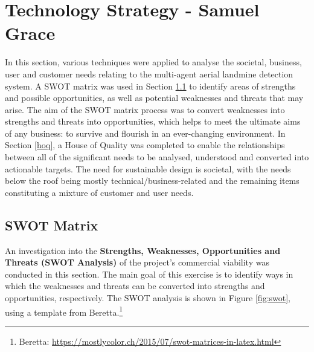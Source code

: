 
\section{Technology Strategy - Samuel Grace}
\label{sec:techstrat}

In this section, various techniques were applied to analyse the societal, business, user and customer needs relating to the multi-agent aerial landmine detection system. A SWOT matrix was used in Section \ref{sec:swot} to identify areas of strengths and possible opportunities, as well as potential weaknesses and threats that may arise. The aim of the SWOT matrix process was to convert weaknesses into strengths and threats into opportunities, which helps to meet the ultimate aims of any business: to survive and flourish in an ever-changing environment. In Section \ref{hoq}, a House of Quality was completed to enable the relationships between all of the significant needs to be analysed, understood and converted into actionable targets. The need for sustainable design is societal, with the needs below the roof being mostly technical/business-related and the remaining items constituting a mixture of customer and user needs. 


\subsection{SWOT Matrix}
\label{sec:swot}

An investigation into the \textbf{Strengths, Weaknesses, Opportunities and Threats (SWOT Analysis)} of the project's commercial viability was conducted in this section. The main goal of this exercise is to identify ways in which the weaknesses and threats can be converted into strengths and opportunities, respectively. The SWOT analysis is shown in Figure \ref{fig:swot}, using a template from Beretta.\footnote{Beretta: \url{https://mostlycolor.ch/2015/07/swot-matrices-in-latex.html}}

